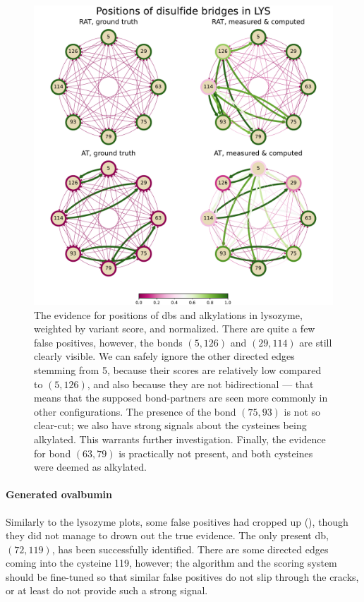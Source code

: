 \begin{figure}
  \centering
  \includegraphics[width=0.9\linewidth]{img/lys.pdf}
  \caption{The evidence for positions of \glspl*{db} and alkylations in lysozyme, weighted by variant score, and normalized. There are quite a few false positives, however, the bonds \((5, 126)\) and \((29, 114)\) are still clearly visible. We can safely ignore the other directed edges stemming from 5, because their scores are relatively low compared to \((5, 126)\), and also because they are not bidirectional --- that means that the supposed bond-partners are seen more commonly in other configurations. The presence of the bond \((75, 93)\) is not so clear-cut; we also have strong signals about the cysteines being alkylated. This warrants further investigation. Finally, the evidence for bond \((63, 79)\) is practically not present, and both cysteines were deemed as alkylated.}\label{fig:lys}
\end{figure}

\paragraph{Generated ovalbumin} Similarly to the lysozyme plots, some false positives had cropped up (), though they did not manage to drown out the true evidence. The only present \gls*{db}, \((72, 119)\), has been successfully identified. There are some directed edges coming into the cysteine 119, however; the algorithm and the scoring system should be fine-tuned so that similar false positives do not slip through the cracks, or at least do not provide such a strong signal.

